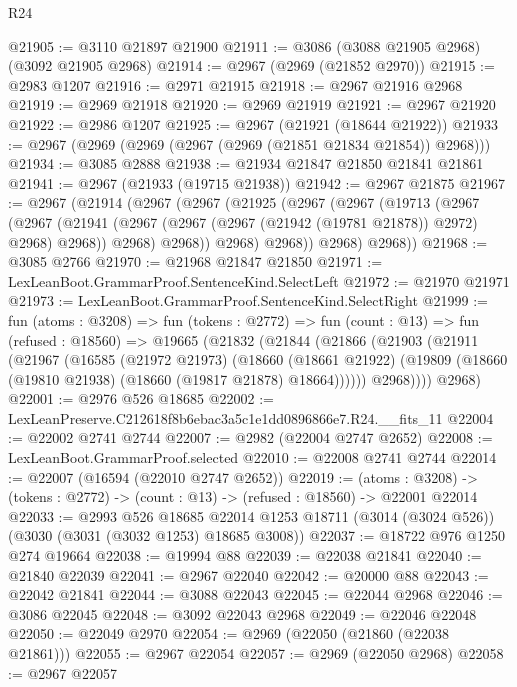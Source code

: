 \begin{lexlean}{R24}
\begin{coremodule}
@21905 := @3110 @21897 @21900
@21911 := @3086 (@3088 @21905 @2968) (@3092 @21905 @2968)
@21914 := @2967 (@2969 (@21852 @2970))
@21915 := @2983 @1207
@21916 := @2971 @21915
@21918 := @2967 @21916 @2968
@21919 := @2969 @21918
@21920 := @2969 @21919
@21921 := @2967 @21920
@21922 := @2986 @1207
@21925 := @2967 (@21921 (@18644 @21922))
@21933 := @2967 (@2969 (@2969 (@2967 (@2969 (@21851 @21834 @21854)) @2968)))
@21934 := @3085 @2888
@21938 := @21934 @21847 @21850 @21841 @21861
@21941 := @2967 (@21933 (@19715 @21938))
@21942 := @2967 @21875
@21967 := @2967
    (@21914
      (@2967
        (@2967
          (@21925
            (@2967
              (@2967
                (@19713
                  (@2967
                    (@2967
                      (@21941 (@2967 (@2967 (@2967 (@21942 (@19781 @21878)) @2972) @2968) @2968))
                      @2968)
                    @2968))
                @2968)
              @2968))
          @2968)
        @2968))
@21968 := @3085 @2766
@21970 := @21968 @21847 @21850
@21971 := LexLeanBoot.GrammarProof.SentenceKind.SelectLeft
@21972 := @21970 @21971
@21973 := LexLeanBoot.GrammarProof.SentenceKind.SelectRight
@21999 := fun (atoms : @3208) =>
  fun (tokens : @2772) =>
  fun (count : @13) =>
  fun (refused : @18560) =>
  @19665
    (@21832
      (@21844
        (@21866
          (@21903
            (@21911
              (@21967
                (@16585
                  (@21972 @21973)
                  (@18660
                    (@18661 @21922)
                    (@19809 (@18660 (@19810 @21938) (@18660 (@19817 @21878) @18664))))))
              @2968))))
      @2968)
@22001 := @2976 @526 @18685
@22002 := LexLeanPreserve.C212618f8b6ebac3a5c1e1dd0896866e7.R24.__fits_11
@22004 := @22002 @2741 @2744
@22007 := @2982 (@22004 @2747 @2652)
@22008 := LexLeanBoot.GrammarProof.selected
@22010 := @22008 @2741 @2744
@22014 := @22007 (@16594 (@22010 @2747 @2652))
@22019 := (atoms : @3208) ->
  (tokens : @2772) -> (count : @13) -> (refused : @18560) -> @22001 @22014
@22033 := @2993
    @526
    @18685
    @22014
    @1253
    @18711
    (@3014 (@3024 @526))
    (@3030 (@3031 (@3032 @1253) @18685 @3008))
@22037 := @18722 @976 @1250 @274 @19664
@22038 := @19994 @88
@22039 := @22038 @21841
@22040 := @21840 @22039
@22041 := @2967 @22040
@22042 := @20000 @88
@22043 := @22042 @21841
@22044 := @3088 @22043
@22045 := @22044 @2968
@22046 := @3086 @22045
@22048 := @3092 @22043 @2968
@22049 := @22046 @22048
@22050 := @22049 @2970
@22054 := @2969 (@22050 (@21860 (@22038 @21861)))
@22055 := @2967 @22054
@22057 := @2969 (@22050 @2968)
@22058 := @2967 @22057

\end{coremodule}
\end{lexlean}
